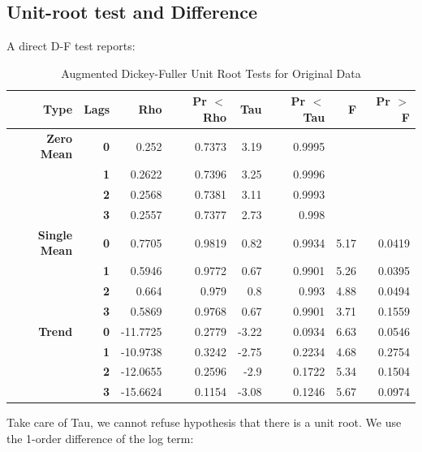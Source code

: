 \documentclass{article}
\begin{document}
\subsection{Unit-root test and Difference}
A direct D-F test reports:
\begin{table}[!ht]
\centering
\begin{tabular}{rrrrrrrr}

{\bf Type} & {\bf Lags} &  {\bf Rho} & {\bf Pr $<$ Rho} &  {\bf Tau} & {\bf Pr $<$ Tau} &    {\bf F} & {\bf Pr $>$ F} \\
\hline
\hline
{\bf Zero Mean} &    {\bf 0} &      0.252 &     0.7373 &       3.19 &     0.9995 &            &            \\

    {\bf } &    {\bf 1} &     0.2622 &     0.7396 &       3.25 &     0.9996 &            &            \\

    {\bf } &    {\bf 2} &     0.2568 &     0.7381 &       3.11 &     0.9993 &            &            \\

    {\bf } &    {\bf 3} &     0.2557 &     0.7377 &       2.73 &      0.998 &            &            \\

{\bf Single Mean} &    {\bf 0} &     0.7705 &     0.9819 &       0.82 &     0.9934 &       5.17 &     0.0419 \\

    {\bf } &    {\bf 1} &     0.5946 &     0.9772 &       0.67 &     0.9901 &       5.26 &     0.0395 \\

    {\bf } &    {\bf 2} &      0.664 &      0.979 &        0.8 &      0.993 &       4.88 &     0.0494 \\

    {\bf } &    {\bf 3} &     0.5869 &     0.9768 &       0.67 &     0.9901 &       3.71 &     0.1559 \\

{\bf Trend} &    {\bf 0} &   -11.7725 &     0.2779 &      -3.22 &     0.0934 &       6.63 &     0.0546 \\

    {\bf } &    {\bf 1} &   -10.9738 &     0.3242 &      -2.75 &     0.2234 &       4.68 &     0.2754 \\

    {\bf } &    {\bf 2} &   -12.0655 &     0.2596 &       -2.9 &     0.1722 &       5.34 &     0.1504 \\

    {\bf } &    {\bf 3} &   -15.6624 &     0.1154 &      -3.08 &     0.1246 &       5.67 &     0.0974 \\
\hline
\end{tabular}  
\caption{Augmented Dickey-Fuller Unit Root Tests for Original Data}
\end{table}
\newpage
Take care of Tau, we cannot refuse hypothesis that there is a unit root. We use the 1-order difference of the log term:
\end{document}
